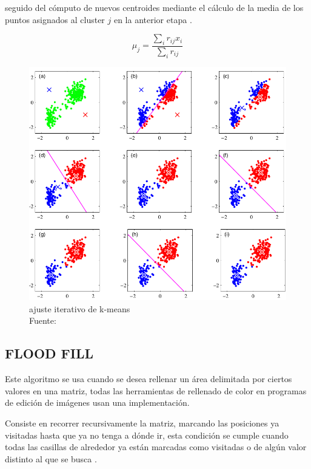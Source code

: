         	seguido del cómputo de nuevos centroides mediante el cálculo de la media de los puntos asignados al cluster $j$ en la anterior etapa \citep{bishop}.
        	
        	\begin{equation}
        		\mu_j = \frac{\sum_{i}r_{ij}x_i}{\sum_{i}r_{ij}}
        	\end{equation}
        
        	\begin{figure}[H]
        		\centering
				\includegraphics[scale=0.31]{imagenes/kmeans}
        		\caption[Ajuste iterativo de k-means]{ajuste iterativo de k-means\\Fuente: \citep{bishop}}
        	\end{figure}
        \subsection{FLOOD FILL}
        	Este algoritmo se usa cuando se desea rellenar un área delimitada por ciertos valores en una matriz, todas las herramientas de rellenado de color en programas de edición de imágenes usan una implementación.
        	
        	Consiste en recorrer recursivamente la matriz, marcando las posiciones ya visitadas hasta que ya no tenga a dónde ir, esta condición se cumple cuando todas las casillas de alrededor ya están marcadas como visitadas o de algún valor distinto al que se busca \citep{halim2013competitive}.\\
        	
